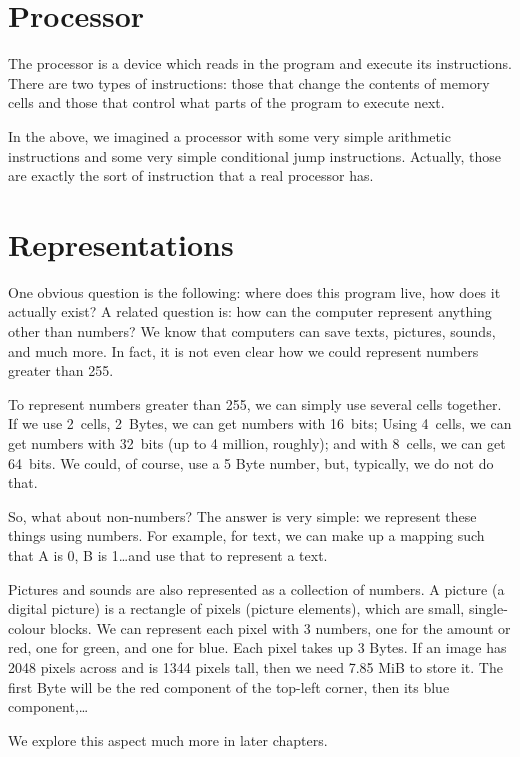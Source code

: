 \section{Processor}

The processor is a device which reads in the program and execute its
instructions. There are two types of instructions: those that change the
contents of memory cells and those that control what parts of the program to
execute next.

In the above, we imagined a processor with some very simple arithmetic
instructions and some very simple conditional jump instructions. Actually,
those are exactly the sort of instruction that a real processor has.

\section{Representations}

One obvious question is the following: where does this program live, how does
it actually exist? A related question is: how can the computer represent
anything other than numbers? We know that computers can save texts, pictures,
sounds, and much more. In fact, it is not even clear how we could represent
numbers greater than 255.

To represent numbers greater than 255, we can simply use several cells
together. If we use 2~cells, 2~Bytes, we can get numbers with 16~bits; Using
4~cells, we can get numbers with 32~bits (up to 4 million, roughly); and with
8~cells, we can get 64~bits. We could, of course, use a 5 Byte number, but,
typically, we do not do that.

So, what about non-numbers?  The answer is very simple: we represent these
things using numbers. For example, for text, we can make up a mapping such that
A is 0, B is 1\ldots and use that to represent a text.

Pictures and sounds are also represented as a collection of numbers. A picture
(a digital picture) is a rectangle of pixels (picture elements), which are
small, single-colour blocks. We can represent each pixel with 3 numbers, one
for the amount or red, one for green, and one for blue. Each pixel takes up 3
Bytes. If an image has 2048 pixels across and is 1344 pixels tall, then we need
7.85 MiB to store it. The first Byte will be the red component of the top-left
corner, then its blue component,\ldots

We explore this aspect much more in later chapters.

